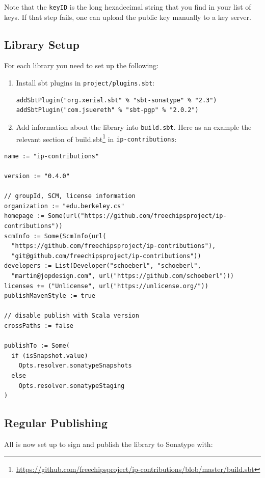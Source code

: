 \documentclass[%
    10pt,
    headinclude, footexclude,
    openright, %
    notitlepage,
    cleardoubleempty,
    headsepline,
    pointlessnumbers,
    bibtotoc, idxtotoc,
    ]{scrbook}
\newcommand{\code}[1]{{\small{\texttt{#1}}}}
\newcommand{\myref}[2]{\href{#1}{#2}}
\renewcommand{\myref}[2]{{#2}{\footnote{\url{#1}}}}
\begin{document}
Note that the \code{keyID} is the long hexadecimal string that you find in your list of keys.
If that step fails, one can upload the public key manually to a key server.

\subsection{Library Setup}

For each library you need to set up the following:

\begin{enumerate}
\item Install sbt plugins in \code{project/plugins.sbt}:
\begin{verbatim}
addSbtPlugin("org.xerial.sbt" % "sbt-sonatype" % "2.3")
addSbtPlugin("com.jsuereth" % "sbt-pgp" % "2.0.2")
\end{verbatim}
\item Add information about the library into \code{build.sbt}. Here as an example
the relevant section of \myref{https://github.com/freechipsproject/ip-contributions/blob/master/build.sbt}{build.sbt}
in \code{ip-contributions}:
\end{enumerate}

{\small
\begin{verbatim}
name := "ip-contributions"

version := "0.4.0"

// groupId, SCM, license information
organization := "edu.berkeley.cs"
homepage := Some(url("https://github.com/freechipsproject/ip-contributions"))
scmInfo := Some(ScmInfo(url(
  "https://github.com/freechipsproject/ip-contributions"),
  "git@github.com/freechipsproject/ip-contributions"))
developers := List(Developer("schoeberl", "schoeberl",
  "martin@jopdesign.com", url("https://github.com/schoeberl")))
licenses += ("Unlicense", url("https://unlicense.org/"))
publishMavenStyle := true

// disable publish with Scala version
crossPaths := false

publishTo := Some(
  if (isSnapshot.value)
    Opts.resolver.sonatypeSnapshots
  else
    Opts.resolver.sonatypeStaging
)
\end{verbatim}
}

\subsection{Regular Publishing}

All is now set up to sign and publish the library to Sonatype with:
\end{document}
